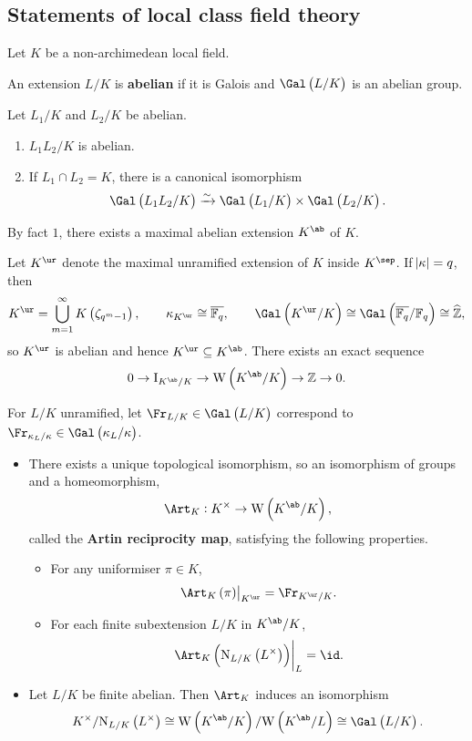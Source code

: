 \pagebreak

\subsection{Statements of local class field theory}


Let $ K $ be a non-archimedean local field.

\begin{definition}
An extension $ L / K $ is \textbf{abelian} if it is Galois and $ \Gal\br{L / K} $ is an abelian group.
\end{definition}

\begin{fact*}
Let $ L_1 / K $ and $ L_2 / K $ be abelian.
\begin{enumerate}
\item $ L_1L_2 / K $ is abelian.
\item If $ L_1 \cap L_2 = K $, there is a canonical isomorphism
$$ \Gal\br{L_1L_2 / K} \xrightarrow{\sim} \Gal\br{L_1 / K} \times \Gal\br{L_2 / K}. $$
\end{enumerate}
By fact $ 1 $, there exists a maximal abelian extension $ K^{\ab} $ of $ K $.
\end{fact*}

\begin{example*}
Let $ K^{\ur} $ denote the maximal unramified extension of $ K $ inside $ K^{\sep} $. If $ \abs{\kappa} = q $, then
$$ K^{\ur} = \bigcup_{m = 1}^\infty K\br{\zeta_{q^m - 1}}, \qquad \kappa_{K^{\ur}} \cong \overline{\FF_q}, \qquad \Gal\br{K^{\ur} / K} \cong \Gal\br{\overline{\FF_q} / \FF_q} \cong \widehat{\ZZ}, $$
so $ K^{\ur} $ is abelian and hence $ K^{\ur} \subseteq K^{\ab} $. There exists an exact sequence
$$ 0 \to \I_{K^{\ab} / K} \to \W\br{K^{\ab} / K} \to \ZZ \to 0. $$
\end{example*}

For $ L / K $ unramified, let $ \Fr_{L / K} \in \Gal\br{L / K} $ correspond to $ \Fr_{\kappa_L / \kappa} \in \Gal\br{\kappa_L / \kappa} $.

\begin{theorem}
\hfill
\begin{itemize}
\item There exists a unique topological isomorphism, so an isomorphism of groups and a homeomorphism,
$$ \Art_K : K^\times \to \W\br{K^{\ab} / K}, $$
called the \textbf{Artin reciprocity map}, satisfying the following properties.
\begin{itemize}
\item For any uniformiser $ \pi \in K $,
$$ \eval{\Art_K\br{\pi}}_{K^{\ur}} = \Fr_{K^{\ur} / K}. $$
\item For each finite subextension $ L / K $ in $ K^{\ab} / K $,
$$ \eval{\Art_K\br{\N_{L / K}\br{L^\times}}}_L = \id. $$
\end{itemize}
\item Let $ L / K $ be finite abelian. Then $ \Art_K $ induces an isomorphism
$$ K^\times / \N_{L / K}\br{L^\times} \cong \W\br{K^{\ab} / K} / \W\br{K^{\ab} / L} \cong \Gal\br{L / K}. $$
\end{itemize}
\end{theorem}

